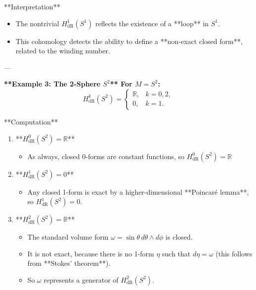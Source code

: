\documentclass[10pt,a4paper]{report}
\begin{document}
\begin{description}
\begin{enumerate}
 **Interpretation**\\
 \begin{itemize}
\item  The nontrivial \( H^1_{\text{dR}}(S^1) \) reflects the existence of a **loop** in \( S^1 \).\\
\item  This cohomology detects the ability to define a **non-exact closed form**, related to the winding number.

\end{itemize}
\end{enumerate}
---

\item \textbf{ **Example 3: The 2-Sphere \( S^2 \)**  
For \( M = S^2 \):
}
\[
H^k_{\text{dR}}(S^2) =
\begin{cases}
\mathbb{R}, & k = 0, 2, \\
0, & k = 1.
\end{cases}
\]

 **Computation**\\
 
 \begin{enumerate}
 
\item  **\( H^0_{\text{dR}}(S^2) = \mathbb{R} \)**  \\
\begin{itemize}
   \item  As always, closed 0-forms are constant functions, so \( H^0_{\text{dR}}(S^2) = \mathbb{R} \)\\

\end{itemize}

\item  **\( H^1_{\text{dR}}(S^2) = 0 \)**  
\begin{itemize}
   \item  Any closed 1-form is exact by a higher-dimensional **Poincaré lemma**, so \( H^1_{\text{dR}}(S^2) = 0 \).\\

\end{itemize}

\item  **\( H^2_{\text{dR}}(S^2) = \mathbb{R} \)**  \\
\begin{itemize}
   \item  The standard volume form \( \omega = \sin\theta \, d\theta \wedge d\phi \) is closed.  \\
   \item  It is not exact, because there is no 1-form \( \eta \) such that \( d\eta = \omega \) (this follows from **Stokes’ theorem**).\\  
   \item  So \( \omega \) represents a generator of \( H^2_{\text{dR}}(S^2) \).


\end{itemize}
\end{enumerate}
\end{description}
\end{document}

